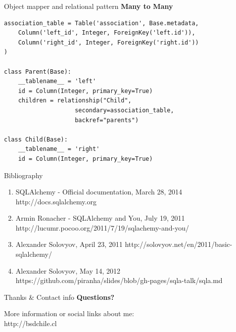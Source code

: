 \documentclass[seagull]{beamer}
\begin{document}
\begin{frame}[fragile]{Object mapper and relational pattern}
\textbf{Many to Many}
\begin{verbatim}
association_table = Table('association', Base.metadata,
    Column('left_id', Integer, ForeignKey('left.id')),
    Column('right_id', Integer, ForeignKey('right.id'))
)

class Parent(Base):
    __tablename__ = 'left'
    id = Column(Integer, primary_key=True)
    children = relationship("Child",
                    secondary=association_table,
                    backref="parents")

class Child(Base):
    __tablename__ = 'right'
    id = Column(Integer, primary_key=True)
\end{verbatim}
\end{frame}

\begin{frame}{Bibliography}
\begin{enumerate}
\item SQLAlchemy - Official documentation, March 28, 2014 http://docs.sqlalchemy.org
\item Armin Ronacher - SQLAlchemy and You, July 19, 2011 http://lucumr.pocoo.org/2011/7/19/sqlachemy-and-you/
\item Alexander Solovyov, April 23, 2011 http://solovyov.net/en/2011/basic-sqlalchemy/
\item Alexander Solovyov, May 14, 2012 https://github.com/piranha/slides/blob/gh-pages/sqla-talk/sqla.md
\end{enumerate}
\end{frame}

\begin{frame}{Thanks \& Contact info}
\centering\textbf{Questions?}
\\
\begin{small}
More information or social links about me:\\
http://bsdchile.cl
\end{small}
\end{frame}

\begin{frame}{}

\end{frame}
\end{document}
